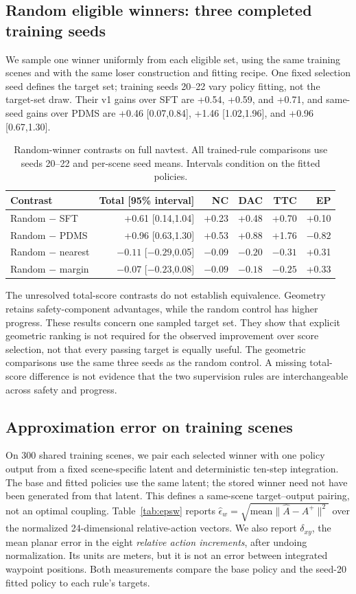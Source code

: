 \documentclass[10pt,letterpaper]{article}
\begin{document}
\subsection{Random eligible winners: three completed training seeds}
We sample one winner uniformly from each eligible set, using the same training scenes and with the same loser construction and fitting recipe. One fixed selection seed defines the target set; training seeds 20--22 vary policy fitting, not the target-set draw. Their v1 gains over SFT are +0.54, +0.59, and +0.71, and same-seed gains over PDMS are +0.46 [0.07,0.84], +1.46 [1.02,1.96], and +0.96 [0.67,1.30].

\begin{table}[H]
\centering
\caption{Random-winner contrasts on full navtest. All trained-rule comparisons use seeds 20--22 and per-scene seed means. Intervals condition on the fitted policies.}
\begin{tabular}{lrrrrr}\toprule
Contrast & Total [95\% interval] & NC & DAC & TTC & EP\\\midrule
Random $-$ SFT & +0.61 [0.14,1.04] & +0.23 & +0.48 & +0.70 & +0.10\\
Random $-$ PDMS & +0.96 [0.63,1.30] & +0.53 & +0.88 & +1.76 & $-0.82$\\
Random $-$ nearest & $-0.11$ [$-0.29$,0.05] & $-0.09$ & $-0.20$ & $-0.31$ & +0.31\\
Random $-$ margin & $-0.07$ [$-0.23$,0.08] & $-0.09$ & $-0.18$ & $-0.25$ & +0.33\\\bottomrule
\end{tabular}
\end{table}
The unresolved total-score contrasts do not establish equivalence. Geometry retains safety-component advantages, while the random control has higher progress. These results concern one sampled target set. They show that explicit geometric ranking is not required for the observed improvement over score selection, not that every passing target is equally useful. The geometric comparisons use the same three seeds as the random control. A missing total-score difference is not evidence that the two supervision rules are interchangeable across safety and progress.

\subsection{Approximation error on training scenes}
On 300 shared training scenes, we pair each selected winner with one policy output from a fixed scene-specific latent and deterministic ten-step integration. The base and fitted policies use the same latent; the stored winner need not have been generated from that latent. This defines a same-scene target--output pairing, not an optimal coupling. Table~\ref{tab:epsw} reports $\hat\epsilon_w=\sqrt{\text{mean}\|\widehat A-A^+\|^2}$ over the normalized 24-dimensional relative-action vectors. We also report $\delta_{xy}$, the mean planar error in the eight \emph{relative action increments}, after undoing normalization. Its units are meters, but it is not an error between integrated waypoint positions. Both measurements compare the base policy and the seed-20 fitted policy to each rule's targets.
\end{document}
